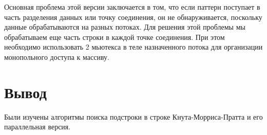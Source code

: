 Основная проблема этой версии заключается в том, что если паттерн поступает в часть разделения данных или точку соединения, он не обнаруживается, поскольку данные обрабатываются на разных потоках.
Для решения этой проблемы мы обрабатываем еще часть строки в каждой точке соединения. При этом необходимо использовать 2 мьютекса в теле назначенного потока для организации монопольного доступа к массиву.

\section*{Вывод}

Были изучены алгоритмы поиска подстроки в строке Кнута-Морриса-Пратта и его параллельная версия.